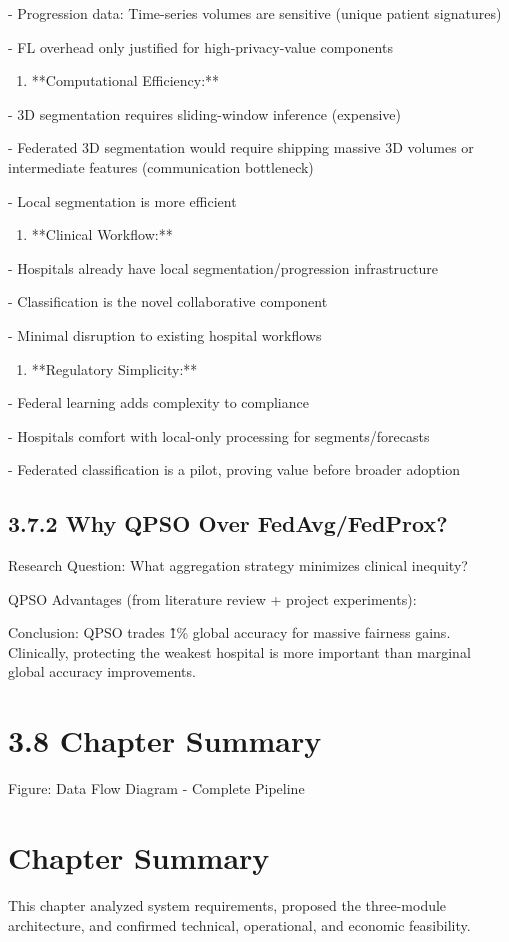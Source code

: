 - Progression data: Time-series volumes are sensitive (unique patient signatures)

- FL overhead only justified for high-privacy-value components

\begin{enumerate}
  \item **Computational Efficiency:**
\end{enumerate}

- 3D segmentation requires sliding-window inference (expensive)

- Federated 3D segmentation would require shipping massive 3D volumes or intermediate features (communication bottleneck)

- Local segmentation is more efficient

\begin{enumerate}
  \item **Clinical Workflow:**
\end{enumerate}

- Hospitals already have local segmentation/progression infrastructure

- Classification is the novel collaborative component

- Minimal disruption to existing hospital workflows

\begin{enumerate}
  \item **Regulatory Simplicity:**
\end{enumerate}

- Federal learning adds complexity to compliance

- Hospitals comfort with local-only processing for segments/forecasts

- Federated classification is a pilot, proving value before broader adoption


\subsection{3.7.2 Why QPSO Over FedAvg/FedProx?}
Research Question: What aggregation strategy minimizes clinical inequity?

QPSO Advantages (from literature review + project experiments):

Conclusion: QPSO trades \~1\% global accuracy for massive fairness gains. Clinically, protecting the weakest hospital is more important than marginal global accuracy improvements.


\section{3.8 Chapter Summary}
Figure: Data Flow Diagram - Complete Pipeline


\section{Chapter Summary}
This chapter analyzed system requirements, proposed the three-module architecture, and confirmed technical, operational, and economic feasibility.
